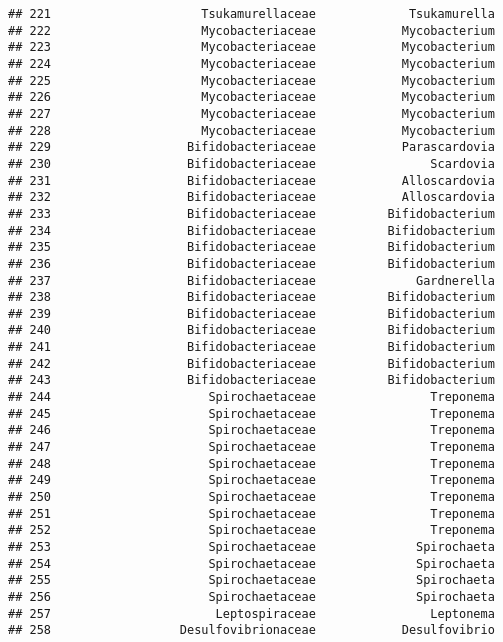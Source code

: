 \documentclass[
]{article}
\begin{document}
\begin{verbatim}
## 221                     Tsukamurellaceae             Tsukamurella
## 222                     Mycobacteriaceae            Mycobacterium
## 223                     Mycobacteriaceae            Mycobacterium
## 224                     Mycobacteriaceae            Mycobacterium
## 225                     Mycobacteriaceae            Mycobacterium
## 226                     Mycobacteriaceae            Mycobacterium
## 227                     Mycobacteriaceae            Mycobacterium
## 228                     Mycobacteriaceae            Mycobacterium
## 229                   Bifidobacteriaceae            Parascardovia
## 230                   Bifidobacteriaceae                Scardovia
## 231                   Bifidobacteriaceae            Alloscardovia
## 232                   Bifidobacteriaceae            Alloscardovia
## 233                   Bifidobacteriaceae          Bifidobacterium
## 234                   Bifidobacteriaceae          Bifidobacterium
## 235                   Bifidobacteriaceae          Bifidobacterium
## 236                   Bifidobacteriaceae          Bifidobacterium
## 237                   Bifidobacteriaceae              Gardnerella
## 238                   Bifidobacteriaceae          Bifidobacterium
## 239                   Bifidobacteriaceae          Bifidobacterium
## 240                   Bifidobacteriaceae          Bifidobacterium
## 241                   Bifidobacteriaceae          Bifidobacterium
## 242                   Bifidobacteriaceae          Bifidobacterium
## 243                   Bifidobacteriaceae          Bifidobacterium
## 244                      Spirochaetaceae                Treponema
## 245                      Spirochaetaceae                Treponema
## 246                      Spirochaetaceae                Treponema
## 247                      Spirochaetaceae                Treponema
## 248                      Spirochaetaceae                Treponema
## 249                      Spirochaetaceae                Treponema
## 250                      Spirochaetaceae                Treponema
## 251                      Spirochaetaceae                Treponema
## 252                      Spirochaetaceae                Treponema
## 253                      Spirochaetaceae              Spirochaeta
## 254                      Spirochaetaceae              Spirochaeta
## 255                      Spirochaetaceae              Spirochaeta
## 256                      Spirochaetaceae              Spirochaeta
## 257                       Leptospiraceae                Leptonema
## 258                  Desulfovibrionaceae            Desulfovibrio

\end{verbatim}
\end{document}
